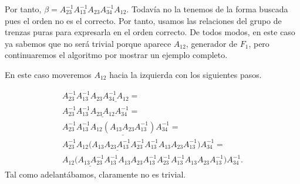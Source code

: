 \documentclass[TFG.tex]{subfiles}
\begin{document}
\begin{ej}
Por tanto, $\beta=A_{23}^{-1}A_{13}^{-1}A_{23}A_{34}^{-1}A_{12}$. Todavía no la tenemos de la forma buscada pues el orden no es el correcto. Por tanto, usamos las relaciones del grupo de trenzas puras para expresarla en el orden correcto. De todos modos, en este caso ya sabemos que no será trivial porque aparece $A_{12}$, generador de $F_1$, pero continuaremos el algoritmo por mostrar un ejemplo completo.

En este caso moveremos $A_{12}$ hacia la izquierda con los siguientes pasos.


\begin{gather*}
A_{23}^{-1}A_{13}^{-1}A_{23}\underline{A_{34}^{-1}A_{12}}=\\
A_{23}^{-1}A_{13}^{-1}\underline{A_{23}A_{12}}A_{34}^{-1}=\\
A_{23}^{-1}A_{13}^{-1}\underline{A_{12}(A_{13}A_{23}A_{13}^{-1})}A_{34}^{-1}=\\
A_{23}^{-1}\underline{A_{12}(A_{13}A_{23}A_{13}^{-1}A_{23}^{-1}A_{13}^{-1}}A_{13}A_{23}A_{13}^{-1})A_{34}^{-1}=\\
\underline{A_{12}(A_{13}A_{23}^{-1}A_{13}^{-1}}A_{13}A_{23}A_{13}^{-1}A_{23}^{-1}A_{13}^{-1}A_{13}A_{23}A_{13}^{-1})A_{34}^{-1}.
\end{gather*}
Tal como adelantábamos, claramente no es trivial.

\begin{figure}[h!]
\centering
{}
\quad
{}
\end{figure}
\end{ej}
\end{document}
